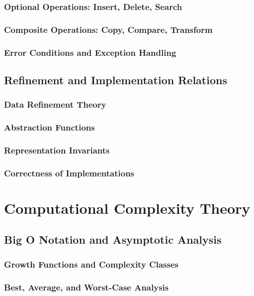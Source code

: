 \documentclass[12pt, oneside]{book}
\begin{document}
\subsubsection{Optional Operations: Insert, Delete, Search}
\subsubsection{Composite Operations: Copy, Compare, Transform}
\subsubsection{Error Conditions and Exception Handling}

\subsection{Refinement and Implementation Relations}
\subsubsection{Data Refinement Theory}
\subsubsection{Abstraction Functions}
\subsubsection{Representation Invariants}
\subsubsection{Correctness of Implementations}

\section{Computational Complexity Theory}
\subsection{Big O Notation and Asymptotic Analysis}
\subsubsection{Growth Functions and Complexity Classes}
\subsubsection{Best, Average, and Worst-Case Analysis}
\end{document}
